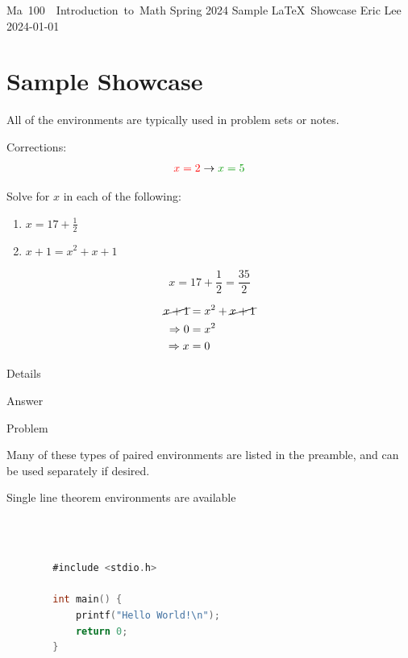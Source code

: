 \documentclass[a4paper]{article}
\begin{document}
\problemset
    {Ma~100~~Introduction~to~Math}
    {Spring 2024}
    {Sample \LaTeX\ Showcase}
    {Eric Lee}
    {2024-01-01}

\section{Sample Showcase}

\begin{note}
    All of the environments are typically used in problem sets or notes.

    Corrections:
    $$
        \correct{x = 2}{x = 5}
    $$
\end{note}

\begin{problem}[Introduction]
    Solve for $x$ in each of the following:
    \begin{enumerate}[label=\alph*)]
        \item $x = 17 + \frac{1}{2}$
        \item $x + 1 = x^2 + x + 1$
    \end{enumerate}
\end{problem}

\begin{lineproof}[1a]
    $$
        x = 17 + \frac{1}{2} = \frac{35}{2}
    $$
\end{lineproof}

\begin{lineproof}[1b]
    \begin{align*}
        \cancel{x + 1} &= x^2 + \cancel{x + 1} \\
        \implies 0 &= x^2 \\
        \implies x &= 0
    \end{align*}
\end{lineproof}

\begin{eg}[Problem]
    Details
\end{eg}
\begin{boxexplanation}
    Answer
\end{boxexplanation}

\begin{lemma}[Name]
    Problem
\end{lemma}
\begin{boxproof}
    Many of these types of paired environments are listed in the preamble, and can be used separately if desired.
\end{boxproof}

\begin{remark}
    Single line theorem environments are available
\end{remark}

\begin{code}\,
    \begin{lstlisting}[language=C]

        #include <stdio.h>

        int main() {
            printf("Hello World!\n");
            return 0;
        }
    \end{lstlisting}
\end{code}
\end{document}
